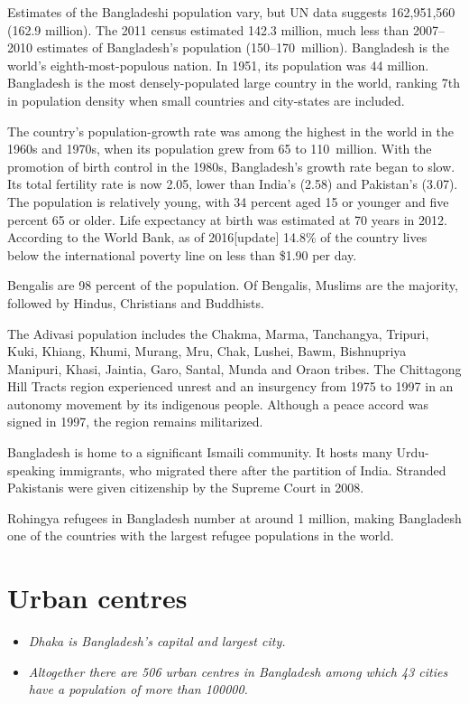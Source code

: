 Estimates of the Bangladeshi population vary, but UN data suggests
162,951,560 (162.9 million). The 2011 census estimated 142.3 million,
much less than 2007--2010 estimates of Bangladesh's population
(150--170~million). Bangladesh is the world's eighth-most-populous
nation. In 1951, its population was 44 million. Bangladesh is the most
densely-populated large country in the world, ranking 7th in population
density when small countries and city-states are included.

The country's population-growth rate was among the highest in the world
in the 1960s and 1970s, when its population grew from 65 to 110~million.
With the promotion of birth control in the 1980s, Bangladesh's growth
rate began to slow. Its total fertility rate is now 2.05, lower than
India's (2.58) and Pakistan's (3.07). The population is relatively
young, with 34 percent aged 15 or younger and five percent 65 or older.
Life expectancy at birth was estimated at 70 years in 2012. According to
the World Bank, as of 2016{[}update{]} 14.8\% of the country lives below
the international poverty line on less than \$1.90 per day.

Bengalis are 98 percent of the population. Of Bengalis, Muslims are the
majority, followed by Hindus, Christians and Buddhists.

The Adivasi population includes the Chakma, Marma, Tanchangya, Tripuri,
Kuki, Khiang, Khumi, Murang, Mru, Chak, Lushei, Bawm, Bishnupriya
Manipuri, Khasi, Jaintia, Garo, Santal, Munda and Oraon tribes. The
Chittagong Hill Tracts region experienced unrest and an insurgency from
1975 to 1997 in an autonomy movement by its indigenous people. Although
a peace accord was signed in 1997, the region remains militarized.

Bangladesh is home to a significant Ismaili community. It hosts many
Urdu-speaking immigrants, who migrated there after the partition of
India. Stranded Pakistanis were given citizenship by the Supreme Court
in 2008.

Rohingya refugees in Bangladesh number at around 1 million, making
Bangladesh one of the countries with the largest refugee populations in
the world.

\section{Urban centres}\label{urban-centres}

\begin{itemize}
\item
  \emph{Dhaka is Bangladesh's capital and largest city.}
\item
  \emph{Altogether there are 506 urban centres in Bangladesh among which
  43 cities have a population of more than 100000.}
\end{itemize}

